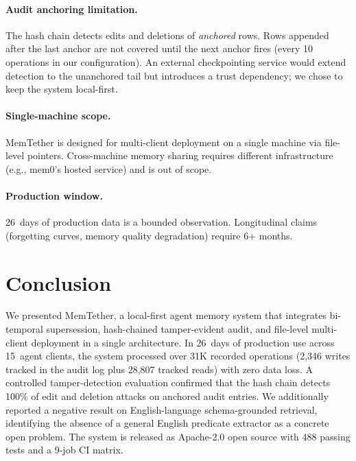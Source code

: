 ﻿\documentclass{article}
\begin{document}
\paragraph{Audit anchoring limitation.}
The hash chain detects edits and deletions of \emph{anchored} rows. Rows appended after the last anchor are not covered until the next anchor fires (every 10 operations in our configuration). An external checkpointing service would extend detection to the unanchored tail but introduces a trust dependency; we chose to keep the system local-first.

\paragraph{Single-machine scope.}
MemTether is designed for multi-client deployment on a single machine via file-level pointers. Cross-machine memory sharing requires different infrastructure (e.g., mem0's hosted service) and is out of scope.

\paragraph{Production window.}
26~days of production data is a bounded observation. Longitudinal claims (forgetting curves, memory quality degradation) require 6+ months.

\section{Conclusion}
We presented MemTether, a local-first agent memory system that integrates bi-temporal supersession, hash-chained tamper-evident audit, and file-level multi-client deployment in a single architecture. In 26~days of production use across 15~agent clients, the system processed over 31K recorded operations (2{,}346 writes tracked in the audit log plus 28{,}807 tracked reads) with zero data loss. A controlled tamper-detection evaluation confirmed that the hash chain detects 100\% of edit and deletion attacks on anchored audit entries. We additionally reported a negative result on English-language schema-grounded retrieval, identifying the absence of a general English predicate extractor as a concrete open problem. The system is released as Apache-2.0 open source with 488 passing tests and a 9-job CI matrix.
\end{document}
